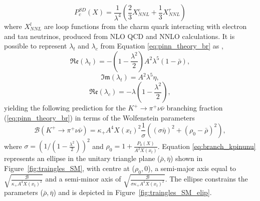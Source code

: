\documentclass[../main.tex]{subfiles}
\begin{document}
    \begin{equation}
        P_c^{SD}(X) = \frac{1}{\lambda^4} \left(\frac{2}{3}X^e_{NNL} + \frac{1}{3} X^{\tau}_{NNL} \right)
    \end{equation}
    where $X^{l}_{NNL}$ are loop functions from the charm quark interacting with electron and tau neutrinos, produced from NLO \gls{QCD} and NNLO calculations.
    It is possible to represent $\lambda_t$ and $\lambda_c$ from Equation \ref{eq:pinn_theory_br} as \cite{Buchalla:1995vs}, %
    \begin{equation}
        \mathfrak{Re}(\lambda_t) = -\left(1-\frac{\lambda^2}{2}\right)A^2\lambda^5(1-\bar{\rho}),
    \end{equation}
    \begin{equation}
        \mathfrak{Im}(\lambda_t) = A^2\lambda^5\eta,
    \end{equation}
    \begin{equation}
        \mathfrak{Re}(\lambda_c) = -\lambda \left(1-\frac{\lambda^2}{2}\right),
    \end{equation}
    yielding the following prediction for the $K^+ \to \pi^+ \nu \bar{\nu}$ branching fraction (\ref{eq:pinn_theory_br}) in terms of the Wolfenstein parameters
    \begin{equation}\label{eq:branch_kpinunu}
        \mathcal{B}(K^+ \to \pi^+ \nu \bar{\nu}) = \kappa_+ A^4X(x_t)^2\frac{1}{\sigma}((\sigma\bar{\eta})^2 + (\rho_0 - \bar{\rho})^2),
    \end{equation}
    where $\sigma = (1 / (1-\frac{\lambda^2}{2}))^2$ and $\rho_0 = 1 + \frac{P_0(X)}{A^2 X(x_t)}$. Equation \ref{eq:branch_kpinunu} represents an ellipse in the unitary triangle plane ($\bar{\rho},\bar{\eta}$) shown in Figure~\ref{fig:traingles_SM}, with centre at ($\rho_0, 0$), a semi-major axis equal to $\sqrt{\frac{\mathcal{B}}{\kappa_+ A^4X(x_t)^2}}$ and a semi-minor axis of $\sqrt{\frac{\mathcal{B}}{\sigma\kappa_+ A^4X(x_t)^2}}$. The ellipse constrains the parameters ($\bar{\rho},\bar{\eta}$) and is depicted in Figure~\ref{fig:traingles_SM_elip}. 
    
\end{document}
